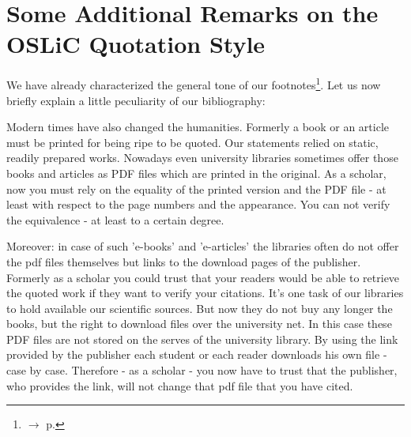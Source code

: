 %
%
%
%
%

\section{Some Additional Remarks on the OSLiC Quotation Style}\label{sec:QuotationAppendix}

We have already characterized the general tone of our
footnotes\footnote{$\rightarrow$ p. \pageref{QuotationPrinciple} }. Let us now
briefly explain a little peculiarity of our bibliography:

Modern times have also changed the humanities. Formerly a book or an article
must be printed for being ripe to be quoted. Our statements relied on static,
readily prepared works. Nowadays even university libraries sometimes offer those
books and articles as PDF files which are printed in the original. As a scholar,
now you must rely on the equality of the printed version and the PDF file - at
least with respect to the page numbers and the appearance. You can not verify the
equivalence - at least to a certain degree.

Moreover: in case of such 'e-books' and 'e-articles' the libraries often do not
offer the pdf files themselves but links to the download pages of the publisher.
Formerly as a scholar you could trust that your readers would be able to
retrieve the quoted work if they want to verify your citations. It's one task of
our libraries to hold available our scientific sources. But now they do not buy
any longer the books, but the right to download files over the university net.
In this case these PDF files are not stored on the serves of the university
library. By using the link provided by the publisher each student or each reader
downloads his own file - case by case. Therefore - as a scholar - you now have
to trust that the publisher, who provides the link, will not change that pdf
file that you have cited.

